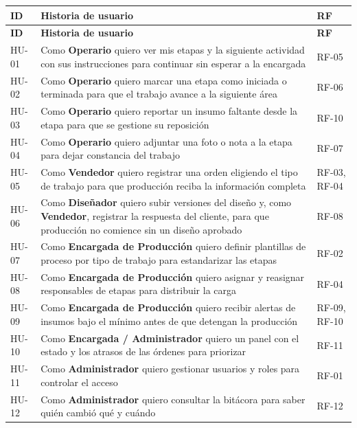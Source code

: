 \documentclass[11pt,a4paper]{article}
\begin{document}
\begingroup
\begin{longtable}{@{}>{\raggedright\arraybackslash\hspace{0pt}}p{}>{\raggedright\arraybackslash\hspace{0pt}}p{}>{\raggedright\arraybackslash\hspace{0pt}}p{}@{}}
\toprule
\textbf{ID} & \textbf{Historia de usuario} & \textbf{RF} \\ \midrule
\endfirsthead
\toprule
\textbf{ID} & \textbf{Historia de usuario} & \textbf{RF} \\ \midrule
\endhead
\bottomrule
\endlastfoot
\mbox{HU-01} & Como \textbf{Operario} quiero ver mis etapas y la siguiente actividad con sus instrucciones para continuar sin esperar a la encargada & \mbox{RF-05} \\ \addlinespace[0.25em]
\mbox{HU-02} & Como \textbf{Operario} quiero marcar una etapa como iniciada o terminada para que el trabajo avance a la siguiente área & \mbox{RF-06} \\ \addlinespace[0.25em]
\mbox{HU-03} & Como \textbf{Operario} quiero reportar un insumo faltante desde la etapa para que se gestione su reposición & \mbox{RF-10} \\ \addlinespace[0.25em]
\mbox{HU-04} & Como \textbf{Operario} quiero adjuntar una foto o nota a la etapa para dejar constancia del trabajo & \mbox{RF-07} \\ \addlinespace[0.25em]
\mbox{HU-05} & Como \textbf{Vendedor} quiero registrar una orden eligiendo el tipo de trabajo para que producción reciba la información completa & \mbox{RF-03}, \mbox{RF-04} \\ \addlinespace[0.25em]
\mbox{HU-06} & Como \textbf{Diseñador} quiero subir versiones del diseño y, como \textbf{Vendedor}, registrar la respuesta del cliente, para que producción no comience sin un diseño aprobado & \mbox{RF-08} \\ \addlinespace[0.25em]
\mbox{HU-07} & Como \textbf{Encargada de Producción} quiero definir plantillas de proceso por tipo de trabajo para estandarizar las etapas & \mbox{RF-02} \\ \addlinespace[0.25em]
\mbox{HU-08} & Como \textbf{Encargada de Producción} quiero asignar y reasignar responsables de etapas para distribuir la carga & \mbox{RF-04} \\ \addlinespace[0.25em]
\mbox{HU-09} & Como \textbf{Encargada de Producción} quiero recibir alertas de insumos bajo el mínimo antes de que detengan la producción & \mbox{RF-09}, \mbox{RF-10} \\ \addlinespace[0.25em]
\mbox{HU-10} & Como \textbf{Encargada / Administrador} quiero un panel con el estado y los atrasos de las órdenes para priorizar & \mbox{RF-11} \\ \addlinespace[0.25em]
\mbox{HU-11} & Como \textbf{Administrador} quiero gestionar usuarios y roles para controlar el acceso & \mbox{RF-01} \\ \addlinespace[0.25em]
\mbox{HU-12} & Como \textbf{Administrador} quiero consultar la bitácora para saber quién cambió qué y cuándo & \mbox{RF-12} \\
\end{longtable}
\end{document}

